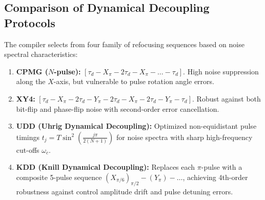 \subsection{Comparison of Dynamical Decoupling Protocols}
The compiler selects from four family of refocusing sequences based on noise spectral characteristics:
\begin{enumerate}
    \item \textbf{CPMG ($N$-pulse):} $[ \tau_d - X_\pi - 2\tau_d - X_\pi - \dots - \tau_d ]$. High noise suppression along the $X$-axis, but vulnerable to pulse rotation angle errors.
    \item \textbf{XY4:} $[ \tau_d - X_\pi - 2\tau_d - Y_\pi - 2\tau_d - X_\pi - 2\tau_d - Y_\pi - \tau_d ]$. Robust against both bit-flip and phase-flip noise with second-order error cancellation.
    \item \textbf{UDD (Uhrig Dynamical Decoupling):} Optimized non-equidistant pulse timings $t_j = T \sin^2\left(\frac{j\pi}{2(N+1)}\right)$ for noise spectra with sharp high-frequency cut-offs $\omega_c$.
    \item \textbf{KDD (Knill Dynamical Decoupling):} Replaces each $\pi$-pulse with a composite 5-pulse sequence $(X_{\pi/6})_{\pi/2} - (Y_\pi) - \dots$, achieving 4th-order robustness against control amplitude drift and pulse detuning errors.
\end{enumerate}

